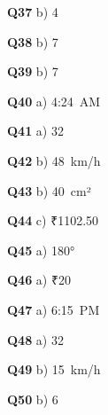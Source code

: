 \textbf{Q37} b) 4\par
\textbf{Q38} b) 7\par
\textbf{Q39} b) 7\par
\textbf{Q40} a) 4:24 AM\par
\textbf{Q41} a) 32\par
\textbf{Q42} b) 48 km/h\par
\textbf{Q43} b) 40 cm²\par
\textbf{Q44} c) ₹1102.50\par
\textbf{Q45} a) 180°\par
\textbf{Q46} a) ₹20\par
\textbf{Q47} a) 6:15 PM\par
\textbf{Q48} a) 32\par
\textbf{Q49} b) 15 km/h\par
\textbf{Q50} b) 6\par